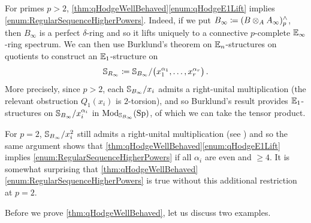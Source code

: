 \documentclass[DIV=12,numbers=enddot,leqno,bibliography=totoc]{scrartcl}
\begin{document}
	\begin{rem}\label{rem:BurklundsMagic}
		For primes $p>2$, \cref{thm:qHodgeWellBehaved}\cref{enum:qHodgeE1Lift} implies \cref{enum:RegularSequenceHigherPowers}. Indeed, if we put $B_\infty\coloneqq (B\otimes_A A_\infty)_p^\complete$, then $B_\infty$ is a perfect $\delta$-ring and so it lifts uniquely to a connective $p$-complete $\mathbb{E}_\infty$-ring spectrum. We can then use Burklund's theorem on $\mathbb{E}_n$-structures on quotients \cite[Theorem~]{BurklundMooreSpectra} to construct an $\mathbb{E}_1$-structure on
		\begin{equation*}
			\IS_{R_\infty}\coloneqq\IS_{B_\infty}/\bigl(x_1^{\alpha_1},\dotsc,x_r^{\alpha_r}\bigr)\,.
		\end{equation*}
		More precisely, since $p>2$, each $\mathbb{S}_{B_\infty}/x_i$ admits a right-unital multiplication (the relevant obstruction $Q_1(x_i)$ is $2$-torsion), and so Burklund's result provides $\mathbb{E}_1$-structures on $\mathbb{S}_{B_\infty}/x_i^{\alpha_i}$ in $\operatorname{Mod}_{\mathbb{S}_{B_\infty}}(\mathrm{Sp})$, of which we can take the tensor product.
		
		For $p=2$, $\mathbb{S}_{B_\infty}/x_i^2$ still admits a right-unital multiplication (see \cite[Remark~]{BurklundMooreSpectra}) and so the same argument shows that \cref{thm:qHodgeWellBehaved}\cref{enum:qHodgeE1Lift} implies \cref{enum:RegularSequenceHigherPowers} if all $\alpha_i$ are even and $\geqslant 4$. It is somewhat surprising that \cref{thm:qHodgeWellBehaved}\cref{enum:RegularSequenceHigherPowers} is true without this additional restriction at $p=2$.
	\end{rem}
	
	Before we prove \cref{thm:qHodgeWellBehaved}, let us discuss two examples.
	
\end{document}
